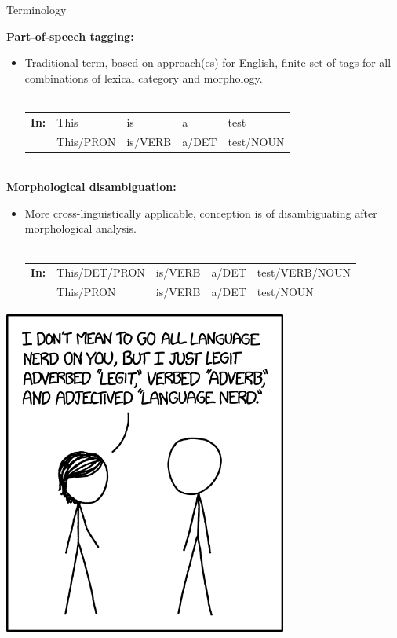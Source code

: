 \documentclass{beamer}
\begin{document}
\begin{frame}{Terminology}


\textbf{Part-of-speech tagging:}
   \begin{itemize}
     \item Traditional term, based on approach(es) for English, finite-set of 
       tags for all combinations of lexical category and morphology. \\ ~ \\
       \begin{tabular}{llllp{}}
         \hline
         \textbf{In:} & This & is & a & test \\
         ~ & This/PRON & is/VERB & a/DET & test/NOUN \\
         \hline
       \end{tabular}
   \end{itemize}
~\\
\textbf{Morphological disambiguation:}
   \begin{itemize}
      \item More cross-linguistically applicable, conception is of disambiguating
        after morphological analysis. \\  ~ \\
       \begin{tabular}{lllll}
         \hline
         \textbf{In:} & This/DET/PRON & is/VERB & a/DET & test/VERB/NOUN \\
         ~ & This/PRON & is/VERB & a/DET & test/NOUN \\
         \hline
       \end{tabular}
   \end{itemize}  

\end{frame}

\begin{frame}
\centering
\includegraphics[width=0.7\textwidth]{images/language-nerd-2x.png}
\end{frame}
\end{document}
